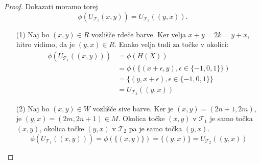 \documentclass[a4paper, 12pt]{book}
\theoremstyle{definition}
\theoremstyle{remark}
\begin{document}
\begin{proof}
Dokazati moramo torej
\[\phi(U_{\mathcal{T}_1}(x,y)) = U_{\mathcal{T}_2}((y,x))\text{.}\]
\begin{itemize}
\item[(1)] Naj bo $(x,y) \in R$ vozlišče rdeče barve. Ker velja $x+y = 2k = y+x$,
hitro vidimo, da je $(y,x) \in R$. Enako velja tudi za točke v okolici:
\begin{align*}
  \phi(U_{\mathcal{T}_1}((x,y))) &= \phi(H(X))\\
  &= \phi(\{(x+\epsilon,y), \epsilon \in \{-1,0,1\}\})\\
  &= \{(y,x+\epsilon), \epsilon \in \{-1,0,1\}\}\\
  &= U_{\mathcal{T}_2}((y,x))
\end{align*}
\item[(2)] Naj bo $(x,y) \in W$ vozlišče sive barve. Ker je $(x,y) = (2n+1, 2m)$,
je $(y,x) = (2m, 2n+1) \in M$. Okolica točke $(x,y)$ v $\mathcal{T}_1$ je samo točka $(x,y)$,
okolica točke $(y,x)$ v $\mathcal{T}_2$ pa je samo točka $(y,x)$.
\[
  \phi(U_{\mathcal{T}_1}((x,y))) = \phi(\{(x,y)\}) = \{(y,x)\} = U_{\mathcal{T}_2}((y,x))
\]
\end{itemize}
\end{proof}

\nocite{*}
\cleardoublepage
{}


\end{document}
